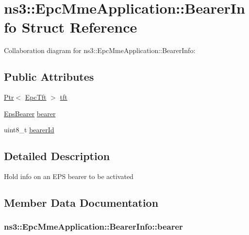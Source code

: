 \hypertarget{structns3_1_1EpcMmeApplication_1_1BearerInfo}{}\section{ns3\+:\+:Epc\+Mme\+Application\+:\+:Bearer\+Info Struct Reference}
\label{structns3_1_1EpcMmeApplication_1_1BearerInfo}


Collaboration diagram for ns3\+:\+:Epc\+Mme\+Application\+:\+:Bearer\+Info\+:
\subsection*{Public Attributes}
\begin{DoxyCompactItemize}
\item 
\hyperlink{classns3_1_1Ptr}{Ptr}$<$ \hyperlink{classns3_1_1EpcTft}{Epc\+Tft} $>$ \hyperlink{structns3_1_1EpcMmeApplication_1_1BearerInfo_ab82e09b5b70eeccff337bb03e84b1ae9}{tft}
\item 
\hyperlink{structns3_1_1EpsBearer}{Eps\+Bearer} \hyperlink{structns3_1_1EpcMmeApplication_1_1BearerInfo_a8481de0e3f076cee029362f6cfd956e0}{bearer}
\item 
uint8\+\_\+t \hyperlink{structns3_1_1EpcMmeApplication_1_1BearerInfo_a189d6bdd0ff5cc3e2cc0910dcff1fad1}{bearer\+Id}
\end{DoxyCompactItemize}


\subsection{Detailed Description}
Hold info on an E\+PS bearer to be activated 

\subsection{Member Data Documentation}
\subsubsection[{\texorpdfstring{bearer}{bearer}}]{ ns3\+::\+Epc\+Mme\+Application\+::\+Bearer\+Info\+::bearer}\hypertarget{structns3_1_1EpcMmeApplication_1_1BearerInfo_a8481de0e3f076cee029362f6cfd956e0}{}\label{structns3_1_1EpcMmeApplication_1_1BearerInfo_a8481de0e3f076cee029362f6cfd956e0}
